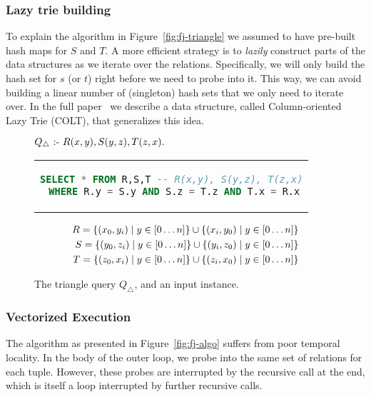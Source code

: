 \subsubsection{Lazy trie building}
To explain the algorithm in Figure~\ref{fig:fj-triangle} we assumed
to have pre-built hash maps for $S$ and $T$.
A more efficient strategy is to {\em lazily} construct parts of the data structures
as we iterate over the relations.
Specifically, we will only build the hash set for $s$ (or $t$)
right before we need to probe into it.
This way, we can avoid building a linear number of (singleton) hash sets
that we only need to iterate over.
In the full paper~\cite{10.1145/3589295} we describe a data structure,
called Column-oriented Lazy Trie (COLT), that generalizes this idea.

\begin{figure}
  $Q_\triangle \text{ :- } R(x, y), S(y, z), T(z, x).$
  \begin{center}
    \begin{tabular}{c}
      \begin{lstlisting}[language=SQL, numbers=none]
SELECT * FROM R,S,T -- R(x,y), S(y,z), T(z,x)
 WHERE R.y = S.y AND S.z = T.z AND T.x = R.x
\end{lstlisting}
    \end{tabular}
  \end{center}
  \begin{align*}
    R  = \{{(x_0, y_i)}\mid{y \in [0 \ldots n]}\} \cup \{{(x_i, y_0)}\mid{y \in [0 \ldots n]}\} \\
    S  = \{{(y_0, z_i)}\mid{y \in [0 \ldots n]}\} \cup \{{(y_i, z_0)}\mid{y \in [0 \ldots n]}\} \\
    T  = \{{(z_0, x_i)}\mid{y \in [0 \ldots n]}\} \cup \{{(z_i, x_0)}\mid{y \in [0 \ldots n]}\}
  \end{align*}
  \caption{The triangle query $Q_\triangle$, and an input instance.}
  \label{fig:triangle-query}
\end{figure}

\subsubsection{Vectorized Execution}\label{sec:vectorized-execution}
The \FJ algorithm as presented in Figure~\ref{fig:fj-algo}
suffers from poor temporal locality.
In the body of the outer loop,
we probe into the same set of relations for each tuple.
However, these probes are interrupted by the recursive
call at the end,
which is itself a loop interrupted by further recursive calls.

